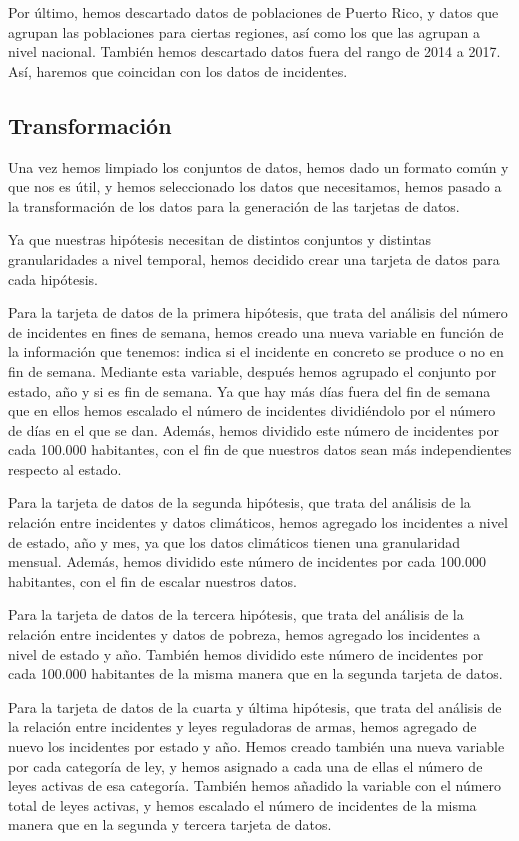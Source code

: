 \documentclass[11pt,a4paper]{article}
\begin{document}
Por último, hemos descartado datos de poblaciones de Puerto Rico, y datos que agrupan las poblaciones para ciertas regiones, así como los que las agrupan a nivel nacional. También hemos descartado datos fuera del rango de 2014 a 2017. Así, haremos que coincidan con los datos de incidentes.

\subsection{Transformación}

Una vez hemos limpiado los conjuntos de datos, hemos dado un formato común y que nos es útil, y hemos seleccionado los datos que necesitamos, hemos pasado a la transformación de los datos para la generación de las tarjetas de datos.

Ya que nuestras hipótesis necesitan de distintos conjuntos y distintas granularidades a nivel temporal, hemos decidido crear una tarjeta de datos para cada hipótesis.

Para la tarjeta de datos de la primera hipótesis, que trata del análisis del número de incidentes en fines de semana, hemos creado una nueva variable en función de la información que tenemos: indica si el incidente en concreto se produce o no en fin de semana. Mediante esta variable, después hemos agrupado el conjunto por estado, año y si es fin de semana. Ya que hay más días fuera del fin de semana que en ellos hemos escalado el número de incidentes dividiéndolo por el número de días en el que se dan. Además, hemos dividido este número de incidentes por cada 100.000 habitantes, con el fin de que nuestros datos sean más independientes respecto al estado.

Para la tarjeta de datos de la segunda hipótesis, que trata del análisis de la relación entre incidentes y datos climáticos, hemos agregado los incidentes a nivel de estado, año y mes, ya que los datos climáticos tienen una granularidad mensual. Además, hemos dividido este número de incidentes por cada 100.000 habitantes, con el fin de escalar nuestros datos.

Para la tarjeta de datos de la tercera hipótesis, que trata del análisis de la relación entre incidentes y datos de pobreza, hemos agregado los incidentes a nivel de estado y año. También hemos dividido este número de incidentes por cada 100.000 habitantes de la misma manera que en la segunda tarjeta de datos.

Para la tarjeta de datos de la cuarta y última hipótesis, que trata del análisis de la relación entre incidentes y leyes reguladoras de armas, hemos agregado de nuevo los incidentes por estado y año. Hemos creado también una nueva variable por cada categoría de ley, y hemos asignado a cada una de ellas el número de leyes activas de esa categoría. También hemos añadido la variable con el número total de leyes activas, y hemos escalado el número de incidentes de la misma manera que en la segunda y tercera tarjeta de datos.
\end{document}

